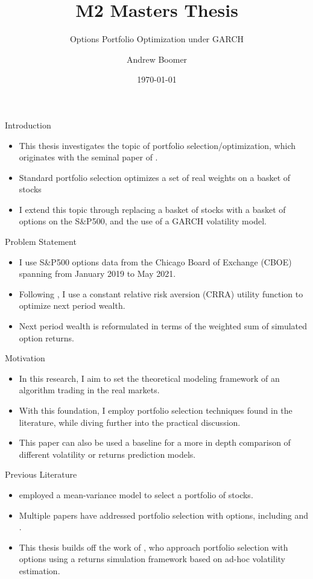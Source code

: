 \documentclass[9pt]{beamer}
\title{M2 Masters Thesis}
\subtitle{Options Portfolio Optimization under GARCH}
\author{Andrew Boomer}
\date{\today}
\begin{document}
\frame{\titlepage}

\begin{frame}{Introduction}
    \begin{itemize}
        \item This thesis investigates the topic of portfolio selection/optimization, which originates with the seminal paper of \cite{markowitz}.
        \item Standard portfolio selection optimizes a set of real weights on a basket of stocks
        \item I extend this topic through replacing a basket of stocks with a basket of options on the S\&P500, and the use of a GARCH volatility model.
    \end{itemize}
\end{frame}

\begin{frame}{Problem Statement}
    \begin{itemize}
        \item I use S\&P500 options data from the Chicago Board of Exchange (CBOE) spanning from January 2019 to May 2021.
        \item Following \cite{faias2017optimal}, I use a constant relative risk aversion (CRRA) utility function to optimize next period wealth.
        \item Next period wealth is reformulated in terms of the weighted sum of simulated option returns.
    \end{itemize}
\end{frame}

\begin{frame}{Motivation}
    \begin{itemize}
        \item In this research, I aim to set the theoretical modeling framework of an algorithm trading in the real markets. 
        \item With this foundation, I employ portfolio selection techniques found in the literature, while diving further into the practical discussion.
        \item This paper can also be used a baseline for a more in depth comparison of different volatility or returns prediction models.
    \end{itemize}
\end{frame}

\begin{frame}{Previous Literature}
    \begin{itemize}
        \item \cite{markowitz} employed a mean-variance model to select a portfolio of stocks.
        \item Multiple papers have addressed portfolio selection with options, including \cite{zhao2018markowitz} and \cite{faias2017optimal}.
        \item This thesis builds off the work of \cite{faias2017optimal}, who approach portfolio selection with options using a returns simulation framework based on ad-hoc volatility estimation.
    \end{itemize}
\end{frame}
\end{document}
